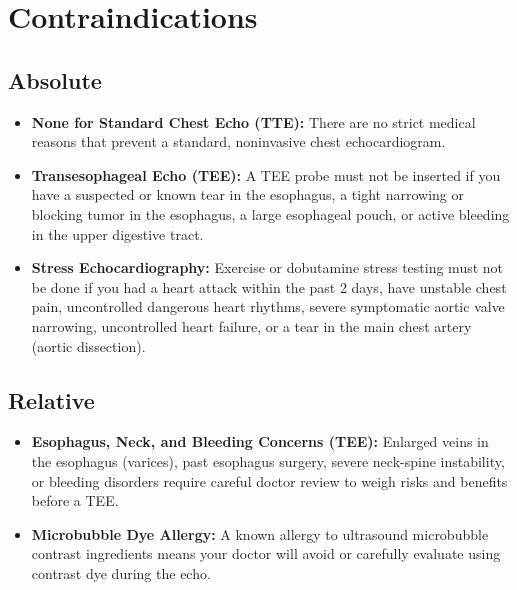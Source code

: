\section{Contraindications}

\subsection{Absolute}
\begin{itemize}
\item \textbf{None for Standard Chest Echo (TTE):} There are no strict medical reasons that prevent a standard, noninvasive chest echocardiogram.
\item \textbf{Transesophageal Echo (TEE):} A TEE probe must not be inserted if you have a suspected or known tear in the esophagus, a tight narrowing or blocking tumor in the esophagus, a large esophageal pouch, or active bleeding in the upper digestive tract.
\item \textbf{Stress Echocardiography:} Exercise or dobutamine stress testing must not be done if you had a heart attack within the past 2 days, have unstable chest pain, uncontrolled dangerous heart rhythms, severe symptomatic aortic valve narrowing, uncontrolled heart failure, or a tear in the main chest artery (aortic dissection).
\end{itemize}

\subsection{Relative}
\begin{itemize}
\item \textbf{Esophagus, Neck, and Bleeding Concerns (TEE):} Enlarged veins in the esophagus (varices), past esophagus surgery, severe neck-spine instability, or bleeding disorders require careful doctor review to weigh risks and benefits before a TEE.
\item \textbf{Microbubble Dye Allergy:} A known allergy to ultrasound microbubble contrast ingredients means your doctor will avoid or carefully evaluate using contrast dye during the echo.
\end{itemize}


